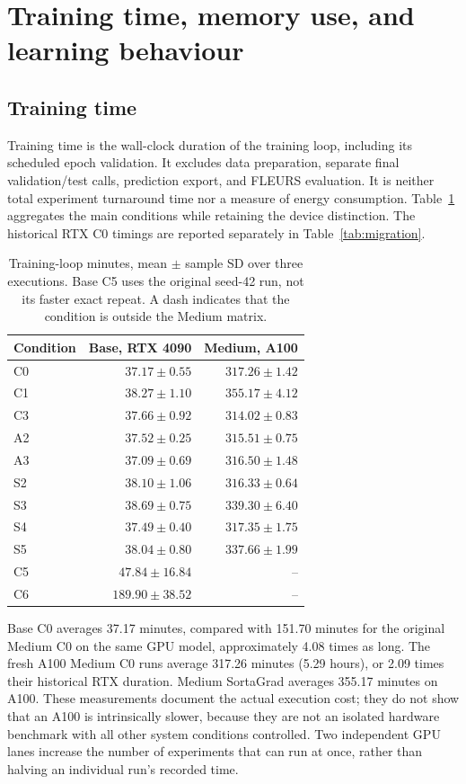 \documentclass[12pt,a4paper]{report}
\begin{document}
\section{Training time, memory use, and learning behaviour}
\label{sec:resources}

\subsection{Training time}

Training time is the wall-clock duration of the training loop, including its
scheduled epoch validation. It excludes data preparation, separate final
validation/test calls, prediction export, and FLEURS evaluation. It is neither
total experiment turnaround time nor a measure of energy consumption.
Table~\ref{tab:time} aggregates the main conditions while retaining the
device distinction. The historical RTX C0 timings are reported separately
in Table~\ref{tab:migration}.

\begin{table}[htbp]\centering\small
\caption{Training-loop minutes, mean $\pm$ sample SD over three executions.
Base C5 uses the original seed-42 run, not its faster exact repeat.
A dash indicates that the condition is outside the Medium matrix.}
\label{tab:time}
\begin{tabular}{lrr}\toprule
Condition & Base, RTX 4090 & Medium, A100\\\midrule
C0 & $37.17 \pm 0.55$ & $317.26 \pm 1.42$ \\
C1 & $38.27 \pm 1.10$ & $355.17 \pm 4.12$ \\
C3 & $37.66 \pm 0.92$ & $314.02 \pm 0.83$ \\
A2 & $37.52 \pm 0.25$ & $315.51 \pm 0.75$ \\
A3 & $37.09 \pm 0.69$ & $316.50 \pm 1.48$ \\
S2 & $38.10 \pm 1.06$ & $316.33 \pm 0.64$ \\
S3 & $38.69 \pm 0.75$ & $339.30 \pm 6.40$ \\
S4 & $37.49 \pm 0.40$ & $317.35 \pm 1.75$ \\
S5 & $38.04 \pm 0.80$ & $337.66 \pm 1.99$ \\
C5 & $47.84 \pm 16.84$ & -- \\
C6 & $189.90 \pm 38.52$ & -- \\
\bottomrule\end{tabular}\end{table}

Base C0 averages 37.17 minutes, compared with 151.70 minutes for the
original Medium C0 on the same GPU model, approximately 4.08 times as long.
The fresh A100 Medium C0 runs average 317.26 minutes (5.29 hours), or
2.09 times their historical RTX duration. Medium SortaGrad averages 355.17
minutes on A100. These measurements document the actual execution cost;
they do not show that an A100 is intrinsically slower, because they are not
an isolated hardware benchmark with all other system conditions controlled.
Two independent GPU lanes increase the number of experiments that can run
at once, rather than halving an individual run's recorded time.
\end{document}
